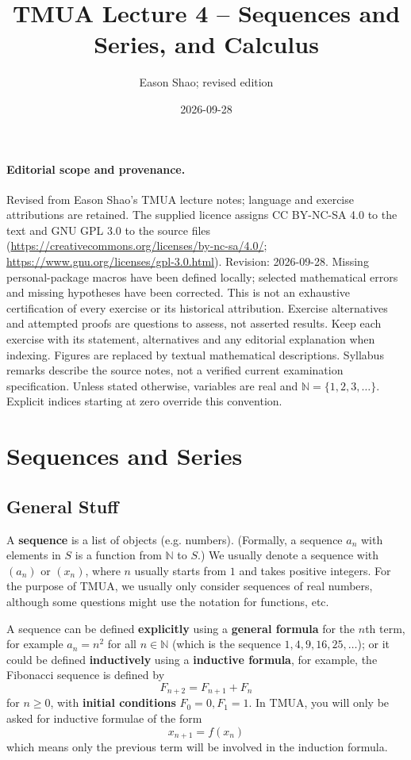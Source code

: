 \documentclass[11pt]{article}
\title{TMUA Lecture 4 -- Sequences and Series, and Calculus}
\author{Eason Shao; revised edition}
\date{2026-09-28}
\theoremstyle{definition}
\theoremstyle{remark}
\newcommand{\pqty}[1]{\left(#1\right)}
\newcommand{\NN}{\mathbb{N}}
\begin{document}
\maketitle
\paragraph{Editorial scope and provenance.}
Revised from Eason Shao's TMUA lecture notes; language and exercise attributions are retained.
The supplied licence assigns CC BY-NC-SA 4.0 to the text and GNU GPL 3.0 to the source files
(\url{https://creativecommons.org/licenses/by-nc-sa/4.0/};
\url{https://www.gnu.org/licenses/gpl-3.0.html}).
Revision: 2026-09-28. Missing personal-package macros have been defined locally;
selected mathematical errors and missing hypotheses have been corrected.
This is not an exhaustive certification of every exercise or its historical attribution.
Exercise alternatives and attempted proofs are questions to assess, not asserted results.
Keep each exercise with its statement, alternatives and any editorial explanation when indexing.
Figures are replaced by textual mathematical descriptions. Syllabus remarks describe the
source notes, not a verified current examination specification.
Unless stated otherwise, variables are real and \(\NN=\{1,2,3,\ldots\}\).
Explicit indices starting at zero override this convention.

\tableofcontents


\section{Sequences and Series}\label{tmua-4-section-001}

\subsection{General Stuff}\label{tmua-4-subsection-001}

A \textbf{sequence} is a list of objects (e.g. numbers). (Formally, a sequence \(a_n\) with elements in \(S\) is a function from \(\NN\) to \(S\).) We usually denote a sequence with \(\pqty{a_n}\) or \(\pqty{x_n}\), where \(n\) usually starts from \(1\) and takes positive integers. For the purpose of TMUA, we usually only consider sequences of real numbers, although some questions might use the notation for functions, etc.

A sequence can be defined \textbf{explicitly} using a \textbf{general formula} for the \(n\)th term, for example \(a_n = n^2\) for all \(n \in \NN\) (which is the sequence \(1, 4, 9, 16, 25, \ldots\)); or it could be defined \textbf{inductively} using a \textbf{inductive formula}, for example, the Fibonacci sequence is defined by
\[
    F_{n + 2} = F_{n + 1} + F_n
\]
for \(n \geq 0\), with \textbf{initial conditions} \(F_0 = 0, F_1 = 1\). In TMUA, you will only be asked for inductive formulae of the form
\[
    x_{n + 1} = f\pqty{x_n}
\]
which means only the previous term will be involved in the induction formula.
\end{document}
